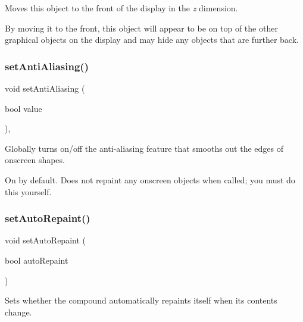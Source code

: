 Moves this object to the front of the display in the {\itshape z} dimension. 

By moving it to the front, this object will appear to be on top of the other graphical objects on the display and may hide any objects that are further back. \mbox{\label{classGObject_a1e43371668ae850193cebedb44e1bbe3}} 
\subsubsection{\texorpdfstring{set\+Anti\+Aliasing()}{setAntiAliasing()}}
{\footnotesize\ttfamily void set\+Anti\+Aliasing (\begin{DoxyParamCaption}\item[{bool}]{value }\end{DoxyParamCaption})\hspace{0.3cm}{\ttfamily [static]}, {\ttfamily [inherited]}}



Globally turns on/off the anti-\/aliasing feature that smooths out the edges of onscreen shapes. 

On by default. Does not repaint any onscreen objects when called; you must do this yourself. \mbox{\label{classGCompound_adf10848319457bd6df4c657bf8872bee}} 
\subsubsection{\texorpdfstring{set\+Auto\+Repaint()}{setAutoRepaint()}}
{\footnotesize\ttfamily void set\+Auto\+Repaint (\begin{DoxyParamCaption}\item[{bool}]{auto\+Repaint }\end{DoxyParamCaption})\hspace{0.3cm}{\ttfamily [virtual]}}



Sets whether the compound automatically repaints itself when its contents change. 

\mbox{\label{classGObject_a71ff7b16b8f1bdc4a1ce9f30cf8b87d8}} 
